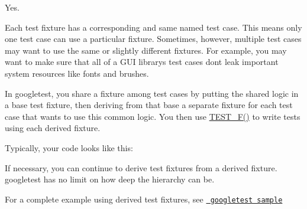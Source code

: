 Yes.

Each test fixture has a corresponding and same named test case. This means only one test case can use a particular fixture. Sometimes, however, multiple test cases may want to use the same or slightly different fixtures. For example, you may want to make sure that all of a G\+UI library\textquotesingle{}s test cases don\textquotesingle{}t leak important system resources like fonts and brushes.

In googletest, you share a fixture among test cases by putting the shared logic in a base test fixture, then deriving from that base a separate fixture for each test case that wants to use this common logic. You then use {\ttfamily \mbox{\hyperlink{gtest_8h_a0ee66d464d1a06c20c1929cae09d8758}{T\+E\+S\+T\+\_\+\+F()}}} to write tests using each derived fixture.

Typically, your code looks like this\+:


\begin{DoxyCode}{0}
\DoxyCodeLine{\};}
\DoxyCodeLine{}
\DoxyCodeLine{  \}}
\DoxyCodeLine{}
\DoxyCodeLine{  \}}
\DoxyCodeLine{}
\DoxyCodeLine{\};}
\DoxyCodeLine{}
\DoxyCodeLine{}
\end{DoxyCode}


If necessary, you can continue to derive test fixtures from a derived fixture. googletest has no limit on how deep the hierarchy can be.

For a complete example using derived test fixtures, see \href{https://github.com/google/googletest/blob/master/googletest/samples/sample5_unittest.cc}{\texttt{ googletest sample}}

